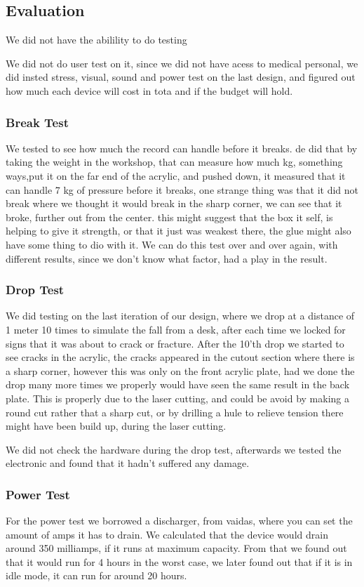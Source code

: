 \subsection{Evaluation}
We did not have the abilility to do testing 


We did not do user test on it, since we did not have acess to medical personal, we did insted stress, visual, sound and power test on the last design, and figured out how much each device will cost in tota and if the budget will hold.

\subsubsection{Break Test}
We tested to see how much the record can handle before it breaks.
de did that by taking the weight in the workshop, that can measure how much kg, something ways,put it on the far end of the acrylic, and pushed down, it measured that it can handle 7 kg of pressure before it breaks, one strange thing was that it did not break where we thought it would break in the sharp corner, we can see that it broke, further out from the center.
this might suggest that the box it self, is helping to give it strength, or that it just was weakest there, the glue might also have some thing to dio with it.
We can do this test over and over again, with different results, since we don't know what factor, had a play in the result.

\subsubsection{Drop Test}
We did testing on the last iteration of our design, where we drop at a distance of 1 meter 10 times to simulate the fall from a desk, after each time we locked for signs that it was about to crack or fracture.
After the 10'th drop we started to see cracks in the acrylic, the cracks appeared in the cutout section where there is a sharp corner, however this was only on the front acrylic plate, had we done the drop many more times we properly would have seen the same result in the back plate.
This is properly due to the laser cutting, and could be avoid by making a round cut rather that a sharp cut, or by drilling a hule to relieve tension there might have been build up, during the laser cutting.

We did not check the hardware during the drop test, afterwards we tested the electronic and found that it hadn't suffered any damage.


\subsubsection{Power Test}
For the power test we borrowed a discharger, from vaidas, where you can set the amount of amps it has to drain.
We calculated that the device would drain around 350 milliamps, if it runs at maximum capacity.
From that we found out that it would run for 4 hours in the worst case, we later found out that if it is in idle mode, it can run for around 20 hours.

